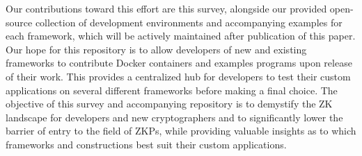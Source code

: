 Our contributions toward this effort are this survey, alongside our provided open-source collection of development environments and accompanying examples for each framework, which will be actively maintained after publication of this paper. Our hope for this repository is to allow developers of new and existing frameworks to contribute Docker containers and examples programs upon release of their work. This provides a centralized hub for developers to test their custom applications on several different frameworks before making a final choice. The objective of this survey and accompanying repository is to demystify the ZK landscape for developers and new cryptographers and to significantly lower the barrier of entry to the field of ZKPs, while providing valuable insights as to which frameworks and constructions best suit their custom applications.



